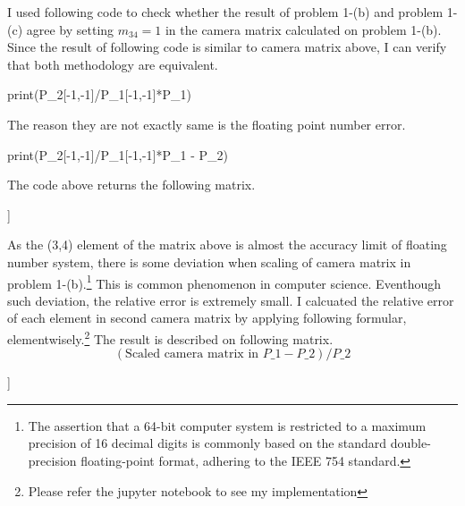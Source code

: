 \documentclass[10pt]{article}
\begin{document}
I used following code to check whether the result of problem 1-(b) and problem 1-(c) agree by setting $m_{34} = 1$ in the camera matrix calculated on problem 1-(b).
Since the result of following code is similar to camera matrix above, I can verify that both methodology are equivalent. 
\begin{python}
print(P_2[-1,-1]/P_1[-1,-1]*P_1)
\end{python}
The reason they are not exactly same is the floating point number error. 
\begin{python}
print(P_2[-1,-1]/P_1[-1,-1]*P_1 - P_2)
\end{python}
The code above returns the following matrix.
\begin{python}
[[-1.86427717e-05 -3.19670417e-05  9.93167477e-05  1.26469280e-02]
 [ 6.08843664e-06 -9.04052567e-06  4.56969897e-05 -4.92271847e-04]
 [ 2.54860563e-08 -3.33770907e-08  7.71079873e-08 -1.11022302e-16]]
\end{python}
As the (3,4) element of the matrix above is almost the accuracy limit of floating number system, there is some deviation when scaling of camera matrix in problem 1-(b).\footnote{The assertion that a 64-bit computer system is restricted to a maximum precision of 16 decimal digits is commonly based on the standard double-precision floating-point format, adhering to the IEEE 754 standard.}
This is common phenomenon in computer science. Eventhough such deviation, the relative error is extremely small. I calcuated the relative error of each element in second camera matrix by applying following formular, elementwisely.\footnote{Please refer the jupyter notebook to see my implementation} The result is described on following matrix.
\begin{equation}
    (\text{Scaled camera matrix in } P\_1 - P\_2)/P\_2
\end{equation}

\begin{python}
[[ 7.99230207e-06  2.90627666e-04  2.94346922e-04  1.71676066e-05]
 [-2.63511359e-05  1.88538311e-05  2.18941679e-05 -3.20431581e-06]
 [-2.01662730e-05  1.61420625e-05  1.49830370e-04 -1.11022302e-16]]
\end{python}
\end{document}

